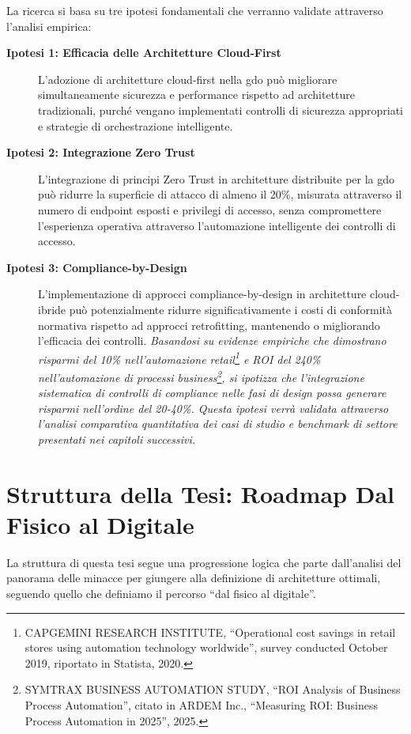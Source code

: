 La ricerca si basa su tre ipotesi fondamentali che verranno validate attraverso l'analisi empirica:

\begin{description}
\item[\textbf{Ipotesi 1: Efficacia delle Architetture Cloud-First}]
L'adozione di architetture cloud-first nella \gls{gdo} può migliorare simultaneamente sicurezza e performance rispetto ad architetture tradizionali, purché vengano implementati controlli di sicurezza appropriati e strategie di orchestrazione intelligente.
\label{hyp:cloud-first}
\item[\textbf{Ipotesi 2: Integrazione Zero Trust}]
L'integrazione di principi Zero Trust in architetture distribuite per la \gls{gdo} può ridurre la superficie di attacco di almeno il 20\%, misurata attraverso il numero di endpoint esposti e privilegi di accesso, senza compromettere l'esperienza operativa attraverso l'automazione intelligente dei controlli di accesso.
\label{hyp:zero-trust}
\item[\textbf{Ipotesi 3: Compliance-by-Design}]
L'implementazione di approcci compliance-by-design in architetture cloud-ibride può potenzialmente ridurre significativamente i costi di conformità normativa rispetto ad approcci retrofitting, mantenendo o migliorando l'efficacia dei controlli. \textit{Basandosi su evidenze empiriche che dimostrano risparmi del 10\% nell'automazione retail\footnote{CAPGEMINI RESEARCH INSTITUTE, ``Operational cost savings in retail stores using automation technology worldwide'', survey conducted October 2019, riportato in Statista, 2020.} e ROI del 240\% nell'automazione di processi business\footnote{SYMTRAX BUSINESS AUTOMATION STUDY, ``ROI Analysis of Business Process Automation'', citato in ARDEM Inc., ``Measuring ROI: Business Process Automation in 2025'', 2025.}, si ipotizza che l'integrazione sistematica di controlli di compliance nelle fasi di design possa generare risparmi nell'ordine del 20-40\%. Questa ipotesi verrà validata attraverso l'analisi comparativa quantitativa dei casi di studio e benchmark di settore presentati nei capitoli successivi.}
\label{hyp:compliance-by-design}
\end{description}

\section{Struttura della Tesi: Roadmap Dal Fisico al Digitale}
\label{sec:struttura-tesi}

La struttura di questa tesi segue una progressione logica che parte dall'analisi del panorama delle minacce per giungere alla definizione di architetture ottimali, seguendo quello che definiamo il percorso ``dal fisico al digitale''.

